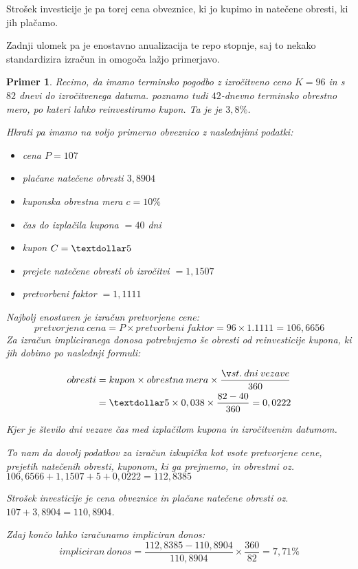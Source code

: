 \documentclass[a4paper, 11pt]{article}
\newtheorem{primer}{Primer}
\begin{document}
Strošek investicije je pa torej cena obveznice, ki jo kupimo in natečene obresti, ki jih plačamo.

Zadnji ulomek pa je enostavno anualizacija te repo stopnje, saj to nekako standardizira izračun
in omogoča lažjo primerjavo. 

\begin{primer}
    Recimo, da imamo terminsko pogodbo z izročitveno ceno $K = 96$ in s $82$ dnevi do izročitvenega
    datuma. poznamo tudi $42$-dnevno terminsko obrestno mero, po kateri lahko reinvestiramo kupon.
    Ta je je $3,8\%$.

    Hkrati pa imamo na voljo primerno obveznico z naslednjimi podatki:

    \begin{itemize}
        \item cena $P = 107$
        \item plačane natečene obresti $3,8904$
        \item kuponska obrestna mera $c = 10\%$
        \item čas do izplačila kupona $ = 40$ dni
        \item kupon $C = \textdollar5$
        \item prejete natečene obresti ob izročitvi $ = 1,1507$
        \item pretvorbeni faktor $ = 1,1111$
    \end{itemize}

    Najbolj enostaven je izračun pretvorjene cene:
    $$ pretvorjena\:cena = P \times pretvorbeni\:faktor = 96 \times 1.1111 = 106,6656 $$
    Za izračun impliciranega donosa potrebujemo še obresti od reinvesticije kupona, ki jih
    dobimo po naslednji formuli:
    
    \begin{align*}
        obresti
        &= kupon \times obrestna\:mera \times \frac{št.\:dni\:vezave}{360} \\
        &= \textdollar5 \times 0,038 \times \frac{82 - 40}{360} = 0,0222 
    \end{align*}

    Kjer je število dni vezave čas med izplačilom kupona in izročitvenim datumom. 

    To nam da dovolj podatkov za izračun izkupička kot vsote pretvorjene cene, prejetih natečenih
    obresti, kuponom, ki ga prejmemo, in obrestmi oz. $106,6566 + 1,1507 + 5 + 0,0222 = 112,8385$

    Strošek investicije je cena obveznice in plačane natečene obresti oz. $107 + 3,8904 = 110,8904$.

    Zdaj končo lahko izračunamo impliciran donos:
    $$ impliciran\:donos = \frac{112,8385 - 110,8904}{110,8904} \times \frac{360}{82} 
    = 7,71\% $$
    
\end{primer}
\end{document}
